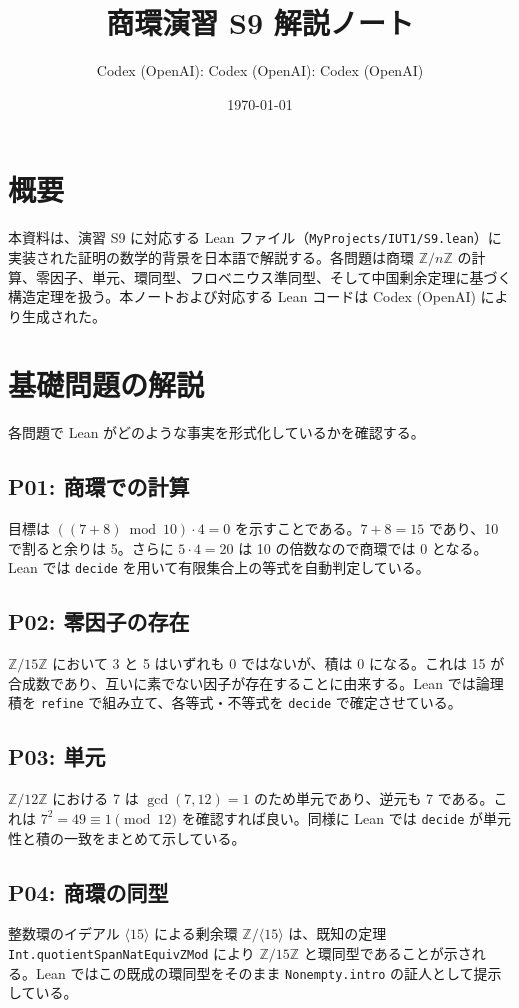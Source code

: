 \documentclass[luatex]{ltjsarticle}
\title{商環演習 S9 解説ノート}
\author{Codex (OpenAI)\TeXファイル生成: Codex (OpenAI)\Leanファイル生成: Codex (OpenAI)}
\date{\today}
\theoremstyle{definition}
\theoremstyle{remark}
\theoremstyle{plain}
\begin{document}
\maketitle

\section{概要}
本資料は、演習 S9 に対応する Lean ファイル（\texttt{MyProjects/IUT1/S9.lean}）に実装された証明の数学的背景を日本語で解説する。各問題は商環 \(\mathbb{Z}/n\mathbb{Z}\) の計算、零因子、単元、環同型、フロベニウス準同型、そして中国剰余定理に基づく構造定理を扱う。本ノートおよび対応する Lean コードは Codex (OpenAI) により生成された。

\section{基礎問題の解説}
各問題で Lean がどのような事実を形式化しているかを確認する。

\subsection{P01: 商環での計算}
目標は \(((7 + 8)\bmod 10) \cdot 4 = 0\) を示すことである。\(7 + 8 = 15\) であり、10 で割ると余りは 5。さらに \(5 \cdot 4 = 20\) は 10 の倍数なので商環では 0 となる。Lean では \texttt{decide} を用いて有限集合上の等式を自動判定している。

\subsection{P02: 零因子の存在}
\(\mathbb{Z}/15\mathbb{Z}\) において 3 と 5 はいずれも 0 ではないが、積は 0 になる。これは 15 が合成数であり、互いに素でない因子が存在することに由来する。Lean では論理積を \texttt{refine} で組み立て、各等式・不等式を \texttt{decide} で確定させている。

\subsection{P03: 単元}
\(\mathbb{Z}/12\mathbb{Z}\) における 7 は \(\gcd(7,12)=1\) のため単元であり、逆元も 7 である。これは \(7^2 = 49 \equiv 1 \pmod{12}\) を確認すれば良い。同様に Lean では \texttt{decide} が単元性と積の一致をまとめて示している。

\subsection{P04: 商環の同型}
整数環のイデアル \(\langle 15 \rangle\) による剰余環 \(\mathbb{Z}/\langle 15 \rangle\) は、既知の定理 \texttt{Int.quotientSpanNatEquivZMod} により \(\mathbb{Z}/15\mathbb{Z}\) と環同型であることが示される。Lean ではこの既成の環同型をそのまま \texttt{Nonempty.intro} の証人として提示している。
\end{document}
